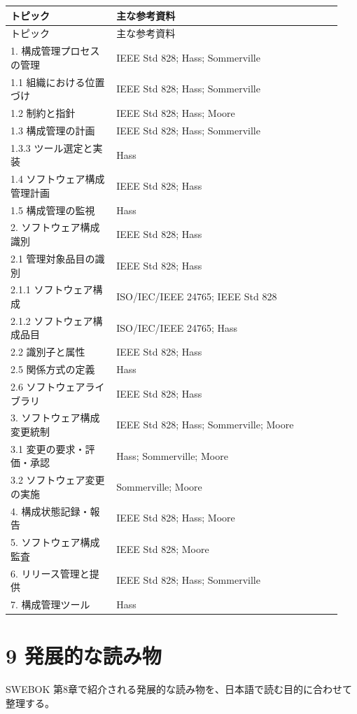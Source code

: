\documentclass[uplatex,a4paper,11pt]{jsarticle}
\begin{document}
\begin{longtable}{p{0.30\linewidth}p{0.64\linewidth}}\toprule
トピック & 主な参考資料 \\ \midrule
\endfirsthead\toprule
トピック & 主な参考資料 \\ \midrule
\endhead
1. 構成管理プロセスの管理 & IEEE Std 828; Hass; Sommerville \\
1.1 組織における位置づけ & IEEE Std 828; Hass; Sommerville \\
1.2 制約と指針 & IEEE Std 828; Hass; Moore \\
1.3 構成管理の計画 & IEEE Std 828; Hass; Sommerville \\
1.3.3 ツール選定と実装 & Hass \\
1.4 ソフトウェア構成管理計画 & IEEE Std 828; Hass \\
1.5 構成管理の監視 & Hass \\
2. ソフトウェア構成識別 & IEEE Std 828; Hass \\
2.1 管理対象品目の識別 & IEEE Std 828; Hass \\
2.1.1 ソフトウェア構成 & ISO/IEC/IEEE 24765; IEEE Std 828 \\
2.1.2 ソフトウェア構成品目 & ISO/IEC/IEEE 24765; Hass \\
2.2 識別子と属性 & IEEE Std 828; Hass \\
2.5 関係方式の定義 & Hass \\
2.6 ソフトウェアライブラリ & IEEE Std 828; Hass \\
3. ソフトウェア構成変更統制 & IEEE Std 828; Hass; Sommerville; Moore \\
3.1 変更の要求・評価・承認 & Hass; Sommerville; Moore \\
3.2 ソフトウェア変更の実施 & Sommerville; Moore \\
4. 構成状態記録・報告 & IEEE Std 828; Hass; Moore \\
5. ソフトウェア構成監査 & IEEE Std 828; Moore \\
6. リリース管理と提供 & IEEE Std 828; Hass; Sommerville \\
7. 構成管理ツール & Hass \\
\bottomrule\end{longtable}
\section*{9 発展的な読み物}
SWEBOK 第8章で紹介される発展的な読み物を、日本語で読む目的に合わせて整理する。
\end{document}
